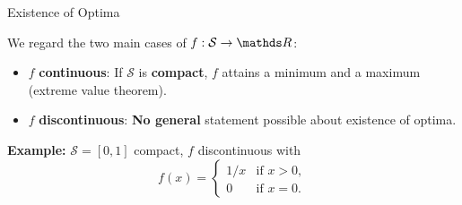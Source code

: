 \documentclass[11pt,compress,t,notes=noshow, xcolor=table]{beamer}
\begin{document}
\begin{vbframe}{Existence of Optima}

\dlz

We regard the two main cases of $f : \mathcal{S} \to \R$:

\begin{itemize}
    \item $f$ \textbf{continuous}: If $\mathcal{S}$ is \textbf{compact}, $f$ attains a minimum and a maximum (extreme value theorem).
    \item $f$ \textbf{discontinuous}: \textbf{No general} statement possible about existence of optima.
\end{itemize}

\lz

\textbf{Example:} $\mathcal{S} = [0,1]$ compact, $f$ discontinuous with
\begin{equation*}
    f(x) = \begin{cases}
        1/x & \text{if $x>0$}, \\
        0 & \text{if $x=0$}.
    \end{cases}
\end{equation*}


\end{vbframe}
\end{document}
